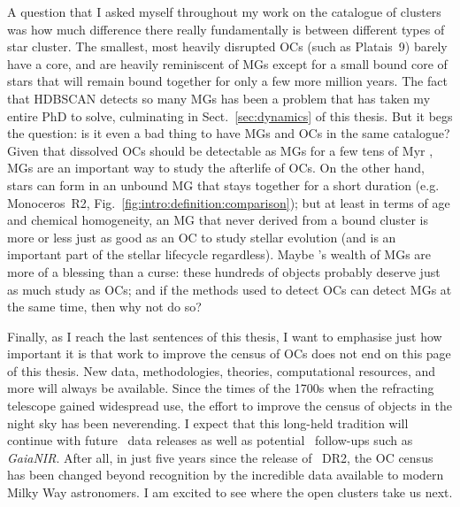 A question that I asked myself throughout my work on the catalogue of clusters was how much difference there really fundamentally is between different types of star cluster. The smallest, most heavily disrupted OCs (such as Platais~9) barely have a core, and are heavily reminiscent of MGs except for a small bound core of stars that will remain bound together for only a few more million years. The fact that HDBSCAN detects so many MGs has been a problem that has taken my entire PhD to solve, culminating in Sect.~\ref{sec:dynamics} of this thesis. But it begs the question: is it even a bad thing to have MGs and OCs in the same catalogue? Given that dissolved OCs should be detectable as MGs for a few tens of Myr \citep{portegies_zwart_young_2010}, MGs are an important way to study the afterlife of OCs. On the other hand, stars can form in an unbound MG that stays together for a short duration (e.g. Monoceros~R2, Fig.~\ref{fig:intro:definition:comparison}); but at least in terms of age and chemical homogeneity, an MG that never derived from a bound cluster is more or less just as good as an OC to study stellar evolution (and is an important part of the stellar lifecycle regardless). Maybe \gaia's wealth of MGs are more of a blessing than a curse: these hundreds of objects probably deserve just as much study as OCs; and if the methods used to detect OCs can detect MGs at the same time, then why not do so?

Finally, as I reach the last sentences of this thesis, I want to emphasise just how important it is that work to improve the census of OCs does not end on this page of this thesis. New data, methodologies, theories, computational resources, and more will always be available. Since the times of the 1700s when the refracting telescope gained widespread use, the effort to improve the census of objects in the night sky has been neverending. I expect that this long-held tradition will continue with future \gaia\ data releases as well as potential \gaia\ follow-ups such as \emph{GaiaNIR}. After all, in just five years since the release of \gaia\ DR2, the OC census has been changed beyond recognition by the incredible data available to modern Milky Way astronomers. I am excited to see where the open clusters take us next.








